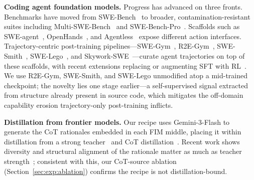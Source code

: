 \textbf{Coding agent foundation models.}
Progress has advanced on three fronts. Benchmarks have moved from
SWE-Bench~\citep{swebench} to broader, contamination-resistant suites
including Multi-SWE-Bench~\citep{multiswebench} and
SWE-Bench-Pro~\citep{swebenchpro}. Scaffolds such as
SWE-agent~\citep{sweagent}, OpenHands~\citep{openhands}, and
Agentless~\citep{agentless} expose different action interfaces.
Trajectory-centric post-training pipelines---SWE-Gym~\citep{swegym},
R2E-Gym~\citep{r2egym}, SWE-Smith~\citep{swesmith},
SWE-Lego~\citep{swelego}, and Skywork-SWE~\citep{skyworkswe}---curate
agent trajectories on top of these scaffolds, with recent extensions
replacing or augmenting SFT with RL~\citep{longcontext-swerl,
selfplay-swerl}. We use R2E-Gym, SWE-Smith, and SWE-Lego unmodified
atop a mid-trained checkpoint; the novelty lies one stage earlier---a
self-supervised signal extracted from structure already present in
source code, which mitigates the off-domain capability erosion
trajectory-only post-training inflicts.

\textbf{Distillation from frontier models.}
Our recipe uses Gemini-3-Flash to generate the CoT rationales embedded
in each FIM middle, placing it within distillation from a strong
teacher~\citep{orca, distillwhisper, magicoder} and CoT
distillation~\citep{ho2023reasoningteachers, hsieh2023distill,
chen2025cotdistill}. Recent work shows diversity and structural
alignment of the rationale matter as much as teacher
strength~\citep{chen2025cotdistill}; consistent with this, our
CoT-source ablation (Section~\ref{sec:exp:ablation}) confirms the
recipe is not distillation-bound.